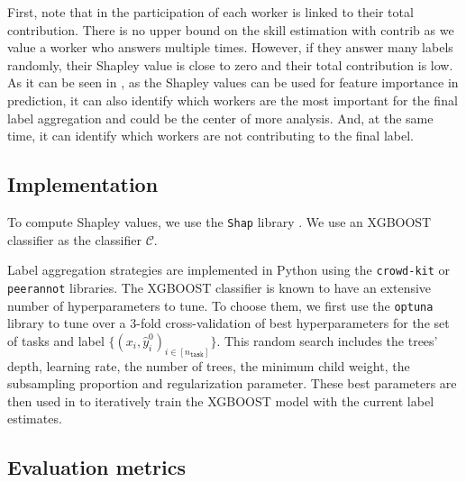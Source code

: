 \documentclass{cap2024}
\begin{document}
First, note that in  the participation of each worker is linked to their total contribution. There is no upper bound on the skill estimation with $\mathrm{contrib}$ as we value a worker who answers multiple times.
However, if they answer many labels randomly, their Shapley value is close to zero and their total contribution is low.
As it can be seen in , as the Shapley values can be used for feature importance in prediction, it can also identify which workers are the most important for the final label aggregation and could be the center of more analysis.
And, at the same time, it can identify which workers are not contributing to the final label.

\subsection{Implementation}
\label{sub:implementation}

To compute Shapley values, we use the \texttt{Shap} library \citep{lundberg2017unified}.
We use an XGBOOST classifier \citep{chen2016xgboost} as the classifier $\mathcal{C}$.


Label aggregation strategies are implemented in Python using the \texttt{crowd-kit} \citep{CrowdKit2023} or \texttt{peerannot} \citep{peerannot} libraries.
The XGBOOST classifier is known to have an extensive number of hyperparameters to tune.
To choose them, we first use the \texttt{optuna} \citep{optuna} library to tune over a $3$-fold cross-validation of best hyperparameters for the set of tasks and label $\{(x_i, \hat{y}_i^0)_{i\in [n_\texttt{task}]}\}$.
This random search includes the trees' depth, learning rate, the number of trees, the minimum child weight, the subsampling proportion and regularization parameter. These best parameters are then used in  to iteratively train the XGBOOST model with the current label estimates.

\subsection{Evaluation metrics}
\end{document}
